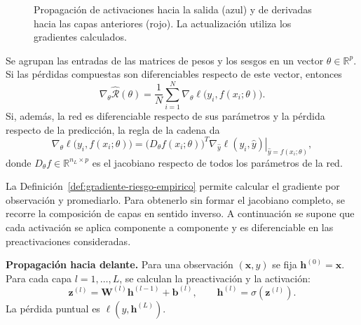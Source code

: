 \begin{figure}[H]
    \caption{Propagación de activaciones hacia la salida (azul) y de derivadas hacia las capas anteriores (rojo). La actualización utiliza los gradientes calculados.}
    \label{fig:backpropagation}
\end{figure}
\newpage
\begin{definition}
\label{def:gradiente-riesgo-empirico}
Se agrupan las entradas de las matrices de pesos y los sesgos en un vector $\theta\in\mathbb R^p$. Si las pérdidas compuestas son diferenciables respecto de este vector, entonces
\[
\nabla_\theta\widehat{\mathcal R}(\theta)
=\frac1N\sum_{i=1}^{N}\nabla_\theta\ell\bigl(y_i,f(x_i;\theta)\bigr).
\]
Si, además, la red es diferenciable respecto de sus parámetros y la pérdida respecto de la predicción, la regla de la cadena da
\[
\nabla_\theta\ell\bigl(y_i,f(x_i;\theta)\bigr)
=\bigl(D_\theta f(x_i;\theta)\bigr)^T
\left.\nabla_{\hat y}\ell(y_i,\hat y)\right|_{\hat y=f(x_i;\theta)},
\]
donde $D_\theta f\in\mathbb R^{n_L\times p}$ es el jacobiano respecto de todos los parámetros de la red.
\end{definition}

La Definición~\ref{def:gradiente-riesgo-empirico} permite calcular el gradiente por observación y promediarlo. Para obtenerlo sin formar el jacobiano completo, se recorre la composición de capas en sentido inverso. A continuación se supone que cada activación se aplica componente a componente y es diferenciable en las preactivaciones consideradas.

\noindent\textbf{Propagación hacia delante.}
Para una observación $(\mathbf x,y)$ se fija $\mathbf h^{(0)}=\mathbf x$. Para cada capa $l=1,\ldots,L$, se calculan la preactivación y la activación:
\[
\mathbf z^{(l)}=\mathbf W^{(l)}\mathbf h^{(l-1)}+\mathbf b^{(l)},
\qquad
\mathbf h^{(l)}=\sigma(\mathbf z^{(l)}).
\]
La pérdida puntual es $\ell(y,\mathbf h^{(L)})$.

